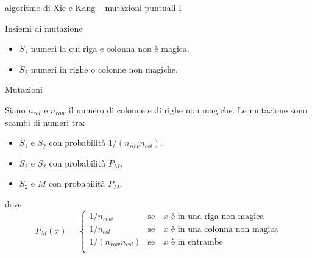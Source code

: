 \documentclass[10pt]{beamer}
\begin{document}
\begin{frame}{algoritmo di Xie e Kang -- mutazioni puntuali I}
	
		
		
    \begin{block}{Insiemi di mutazione}
    	\parbox{0.98\columnwidth}{
    		\begin{itemize}
    			\item $ S_1 $ numeri la cui riga e colonna non è magica.
    			\item $ S_2 $ numeri in righe o colonne non magiche.
    		\end{itemize}
    	}
    \end{block} 
    
        
    \begin{block}{Mutazioni}
    	\parbox{0.98\columnwidth}{
    		Siano $ n_{col} $ e $ n_{row} $ il numero di colonne e di righe non magiche. Le mutazione sono scambi di numeri tra:
    		\begin{itemize}
    			\item $ S_1 $ e $ S_2 $ con probabilità $ 1/(n_{row}n_{col}) $.
    			\item $ S_2 $ e $ S_2 $ con probabilità $ P_M $.
    			\item $ S_2 $ e $ M $ con probabilità $ P_M $.
    		\end{itemize}
    		dove 
    		\vspace*{-15pt}
    		\[ 
    		P_M(x) = 
    		\begin{cases}
    		1\slash n_{row} & \text{se} \quad x \text{ è in una riga non magica} \\
    		1\slash n_{col} & \text{se} \quad x \text{ è in una colonna non magica} \\
    		1\slash \left(n_{row} n_{col} \right) & \text{se} \quad x \text{ è in entrambe} \\
    		\end{cases}
    		\]
    	}
    \end{block} 
    

\end{frame}
\end{document}
